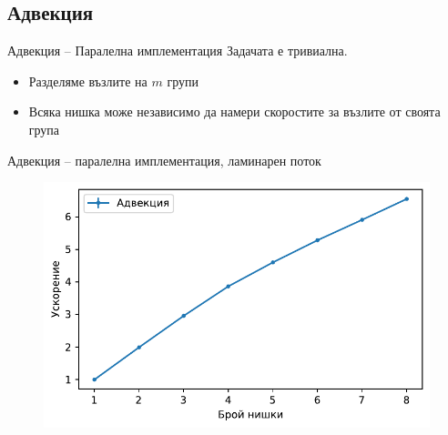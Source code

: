 \documentclass{beamer}
\begin{document}
\subsection{Адвекция}
\begin{frame}{Адвекция -- Паралелна имплементация}
	Задачата е тривиална.
	\begin{itemize}[<+->]
		\item Разделяме възлите на $m$ групи
		\item Всяка нишка може независимо да намери скоростите за възлите от своята група
	\end{itemize}
\end{frame}
\begin{frame}{Адвекция -- паралелна имплементация, ламинарен поток}
        \begin{figure}[htbp]
            \centering
            \includegraphics[width=\linewidth]{../../Figures/BG/LaminarAdvectionSpeedUpC2.pdf} 
        \end{figure}
\end{frame}
\end{document}
